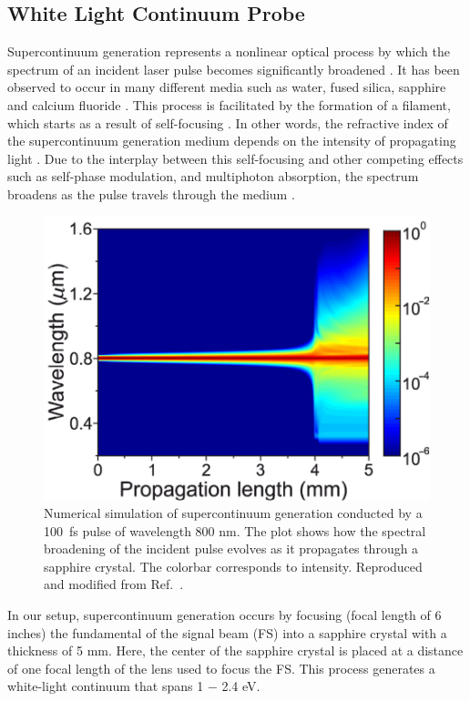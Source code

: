 \subsection{White Light Continuum Probe}

\label{section:white_light_probe}
Supercontinuum generation represents a nonlinear optical process by which the spectrum of an incident laser pulse becomes significantly broadened \cite{alfano1970emission, alfano1970observation, alfano1989supercontinuum, dubietis2017ultrafast}. It has been observed to occur in many different media such as water, fused silica, sapphire and calcium fluoride \cite{alfano1989supercontinuum, dubietis2017ultrafast}. This process is facilitated by the formation of a filament, which starts as a result of self-focusing \cite{alfano1989supercontinuum, dubietis2017ultrafast}. In other words, the refractive index of the supercontinuum generation medium depends on the intensity of propagating light \cite{alfano1989supercontinuum, dubietis2017ultrafast}. Due to the interplay between this self-focusing and other competing effects such as self-phase modulation, and multiphoton absorption, the spectrum  broadens as the pulse travels through the medium \cite{alfano1989supercontinuum, dubietis2017ultrafast}.

\begin{figure}[ht]
	\centering
	\includegraphics[scale=0.4]{images/chapter_methods/sc_gen_dubietis}
	\caption{Numerical simulation of supercontinuum generation conducted by a 100~fs pulse of wavelength 800 nm. The plot shows how the spectral broadening of the incident pulse evolves as it propagates through a sapphire crystal. The colorbar corresponds to intensity. Reproduced and modified from Ref.\ \cite{dubietis2017ultrafast}.}
\end{figure}
In our setup, supercontinuum generation occurs by focusing (focal length of 6 inches) the fundamental of the signal beam (FS) into a sapphire crystal with a thickness of 5 mm. Here, the center of the sapphire crystal is placed at a distance of one focal length of the lens used to focus the FS. This process generates a white-light continuum that spans 1 $-$ 2.4 eV.

